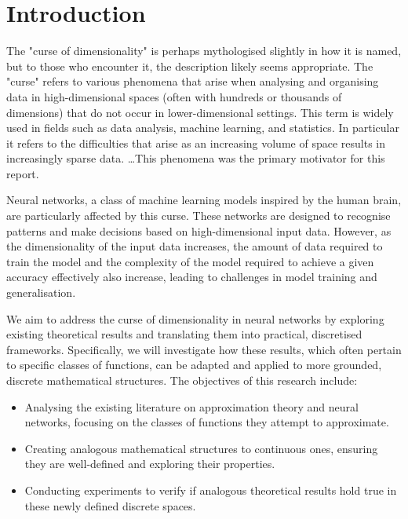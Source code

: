 \documentclass[11pt,a4paper]{article}
\begin{document}

\pagebreak

\section{Introduction}


The "curse of dimensionality" is perhaps mythologised slightly in how it is named, but to those who encounter it, the description likely seems appropriate. The "curse" refers to various phenomena that arise when analysing and organising data in high-dimensional spaces (often with hundreds or thousands of dimensions) that do not occur in lower-dimensional settings. This term is widely used in fields such as data analysis, machine learning, and statistics. In particular it refers to the difficulties that arise as an increasing volume of space results in increasingly sparse data. \cite{enwiki:1223692835}\dots This phenomena was the primary motivator for this report.

Neural networks, a class of machine learning models inspired by the human brain, are particularly affected by this curse. These networks are designed to recognise patterns and make decisions based on high-dimensional input data. However, as the dimensionality of the input data increases, the amount of data required to train the model and the complexity of the model required to achieve a given accuracy effectively also increase, leading to challenges in model training and generalisation.

We aim to address the curse of dimensionality in neural networks by exploring existing theoretical results and translating them into practical, discretised frameworks. Specifically, we will investigate how these results, which often pertain to specific classes of functions, can be adapted and applied to more grounded, discrete mathematical structures. The objectives of this research include:

\begin{itemize}
    \item Analysing the existing literature on approximation theory and neural networks, focusing on the classes of functions they attempt to approximate.
    \item Creating analogous mathematical structures to continuous ones, ensuring they are well-defined and exploring their properties.
    \item Conducting experiments to verify if analogous theoretical results hold true in these newly defined discrete spaces.
\end{itemize}
\end{document}
